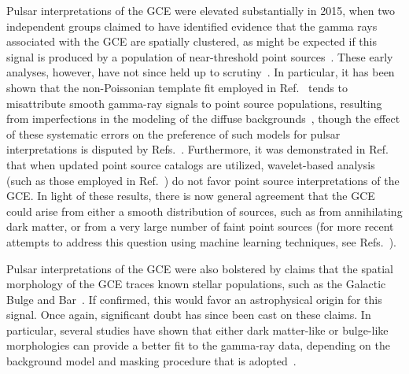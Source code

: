 \documentclass[a4paper,11pt]{article}
\begin{document}
Pulsar interpretations of the GCE were elevated substantially in 2015, when two independent groups claimed to have identified evidence that the gamma rays associated with the GCE are spatially clustered, as might be expected if this signal is produced by a population of near-threshold point sources~\cite{Lee:2015fea,Bartels:2015aea}. These early analyses, however, have not since held up to scrutiny~\cite{Leane:2019xiy,Leane:2020nmi,Leane:2020pfc,Zhong:2019ycb}. In particular, it has been shown that the non-Poissonian template fit employed in Ref.~\cite{Lee:2015fea} tends to misattribute smooth gamma-ray signals to point source populations, resulting from imperfections in the modeling of the diffuse backgrounds~\cite{Leane:2019xiy,Leane:2020nmi,Leane:2020pfc}, though the effect of these systematic errors on the preference of such models for pulsar interpretations is disputed by Refs.~\cite{Chang:2019ars,Buschmann:2020adf}.  Furthermore, it was demonstrated in Ref.~\cite{Zhong:2019ycb} that when updated point source catalogs are utilized, wavelet-based analysis (such as those employed in Ref.~\cite{Bartels:2015aea}) do
not favor point source interpretations of the GCE. In light of these results, there is now general agreement that the GCE could arise from either a smooth distribution of sources, such as from annihilating dark matter, or from a very large number of faint point sources (for more recent attempts to address this question using machine learning techniques, see Refs.~\cite{List:2021aer,Mishra-Sharma:2021oxe,List:2020mzd,Caron:2017udl,Caron:2022akb,Ramirez:2024oiw}). 

Pulsar interpretations of the GCE were also bolstered by claims that the spatial morphology of the GCE traces known stellar populations, such as the Galactic Bulge and Bar~\cite{Macias:2019omb,Macias:2016nev,Bartels:2017vsx,Ramirez:2024oiw,Song:2024iup}. If confirmed, this would favor an astrophysical origin for this signal. Once again, significant doubt has since been cast on these claims. In particular, several studies have shown that either dark matter-like or bulge-like morphologies can provide a better fit to the gamma-ray data, depending on the background model and masking procedure that is adopted~\cite{Zhong:2024vyi,McDermott:2022zmq,Cholis:2021rpp,DiMauro:2021raz,Song:2024iup}. 
\end{document}
